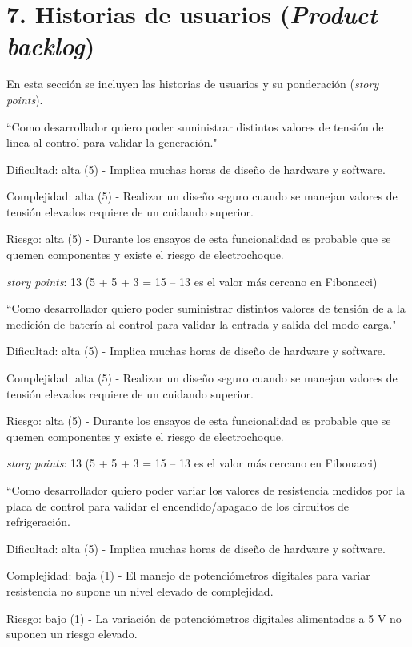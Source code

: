 \documentclass[
11pt, %
codirector, %
]{charter}
\begin{document}
\section{7. Historias de usuarios (\textit{Product backlog})}
\label{sec:backlog}

En esta sección se incluyen las historias de usuarios y su ponderación (\textit{story points}).

``Como desarrollador quiero poder suministrar distintos valores de tensión de linea al control para validar la generación."

Dificultad: alta (5) - Implica muchas horas de diseño de hardware y software.

Complejidad: alta (5) - Realizar un diseño seguro cuando se manejan valores de tensión elevados requiere de un cuidando superior.

Riesgo: alta (5) - Durante los ensayos de esta funcionalidad es probable que se quemen componentes y existe el riesgo de electrochoque.

\textit{story points}: 13
(5 + 5 + 3 = 15 -- 13 es el valor más cercano en Fibonacci) 

``Como desarrollador quiero poder suministrar distintos valores de tensión de a la medición de batería al control para validar la entrada y salida del modo carga."

Dificultad: alta (5) - Implica muchas horas de diseño de hardware y software.

Complejidad: alta (5) - Realizar un diseño seguro cuando se manejan valores de tensión elevados requiere de un cuidando superior.

Riesgo: alta (5) - Durante los ensayos de esta funcionalidad es probable que se quemen componentes y existe el riesgo de electrochoque.

\textit{story points}: 13
(5 + 5 + 3 = 15 -- 13 es el valor más cercano en Fibonacci)

``Como desarrollador quiero poder variar los valores de resistencia medidos por la placa de control para validar el encendido/apagado de los circuitos de refrigeración.

Dificultad: alta (5) - Implica muchas horas de diseño de hardware y software.

Complejidad: baja (1) - El manejo de potenciómetros digitales para variar resistencia no supone un nivel elevado de complejidad.

Riesgo: bajo (1) - La variación de potenciómetros digitales alimentados a 5 V no suponen un riesgo elevado.
\end{document}
